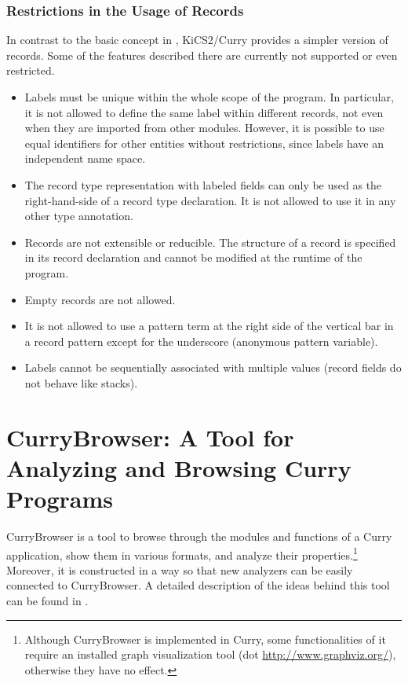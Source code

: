 \documentclass[11pt,fleqn]{article}
\newcommand{\cb}{CurryBrowser\xspace}
\begin{document}
\subsubsection{Restrictions in the Usage of Records}
\label{sec-restrinrecs}

In contrast to the basic concept in \cite{Leijen05}, KiCS2/Curry provides a
simpler version of records. Some of the features described there are
currently not supported or even restricted.

\begin{itemize}
\item Labels must be unique within the whole scope of the program.
  In particular, it is not allowed to define the same label within
  different records, not even when they are imported from other
  modules. However, it is possible to use equal identifiers for other
  entities without restrictions, since labels have an independent 
  name space.
\item The record type representation with labeled fields can only be
  used as the right-hand-side of a record type declaration. It is
  not allowed to use it in any other type annotation.
\item Records are not extensible or reducible. The structure of a
  record is specified in its record declaration and cannot be
  modified at the runtime of the program.
\item Empty records are not allowed.
\item It is not allowed  to use a pattern term
  at the right side of the vertical bar in a record pattern
  except for the underscore (anonymous pattern variable).
\item Labels cannot be sequentially associated with multiple values
  (record fields do not behave like stacks).
\end{itemize}


\newpage



\newpage

\section{\cb: A Tool for Analyzing and Browsing Curry Programs}
\label{sec-currybrowser}

\cb is a tool to browse through the modules and functions
of a Curry application, show them in various formats,
and analyze their properties.\footnote{Although \cb is
implemented in Curry, some functionalities of it require an
installed graph visualization tool (dot \url{http://www.graphviz.org/}),
otherwise they have no effect.}
Moreover, it is constructed in a way so that
new analyzers can be easily connected to \cb.
A detailed description of the ideas behind this tool can be
found in \cite{Hanus05WCFLP,Hanus06WLPE}.
\end{document}
